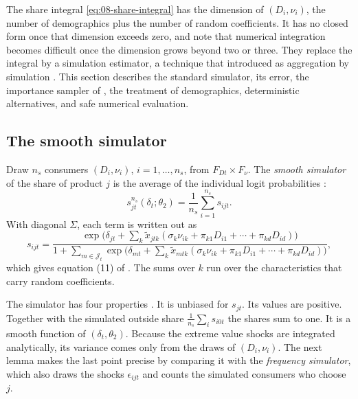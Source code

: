 The share integral \eqref{eq:08-share-integral} has the dimension of $(D_i, \nu_i)$, the number of demographics
plus the number of random coefficients. It has no closed form once that dimension exceeds zero, and
\citet[p.~866]{BerryLevinsohnPakes1995} note that numerical integration becomes difficult once the dimension grows
beyond two or three. They replace the integral by a simulation estimator, a technique that
\citet{Pakes1986} introduced as aggregation by simulation \citep[p.~848]{BerryLevinsohnPakes1995}. This section
describes the standard simulator, its error, the importance sampler of \citet{BerryLevinsohnPakes1995}, the
treatment of demographics, deterministic alternatives, and safe numerical evaluation.

\subsection{The smooth simulator}\label{sec:08-smooth-simulator}

Draw $n_s$ consumers $(D_i, \nu_i)$, $i = 1, \dots, n_s$, from $F_{Dt} \times F_\nu$. The \emph{smooth
simulator} of the share of product $j$ is the average of the individual logit probabilities
\citep[eq.~(6.10)]{BerryLevinsohnPakes1995}:
\begin{equation}\label{eq:08-smooth-simulator}
  s^{n_s}_{jt}(\delta_t; \theta_2) = \frac{1}{n_s}\sum_{i=1}^{n_s} s_{ijt}.
\end{equation}
With diagonal $\Sigma$, each term is written out as
\begin{equation*}
  s_{ijt} = \frac{\exp\bigl(\delta_{jt} + \sum_{k} \tilde x_{jtk}(\sigma_k\nu_{ik} + \pi_{k1}D_{i1} + \cdots
            + \pi_{kd}D_{id})\bigr)}
         {1 + \sum_{m \in \mathcal{J}_t}\exp\bigl(\delta_{mt} + \sum_{k} \tilde x_{mtk}(\sigma_k\nu_{ik}
          + \pi_{k1}D_{i1} + \cdots + \pi_{kd}D_{id})\bigr)},
\end{equation*}
which gives equation (11) of \citet{Nevo2000a}. The sums over $k$ run over the characteristics that carry random
coefficients.

The simulator has four properties \citep[p.~865]{BerryLevinsohnPakes1995}. It is unbiased for $s_{jt}$. Its
values are positive. Together with the simulated outside share $\frac{1}{n_s}\sum_i s_{i0t}$ the shares sum to
one. It is a smooth function of $(\delta_t, \theta_2)$. Because the extreme value shocks are integrated
analytically, its variance comes only from the draws of $(D_i, \nu_i)$. The next lemma makes the last point precise
by comparing it with the \emph{frequency simulator}, which also draws the shocks $\epsilon_{ijt}$ and counts the
simulated consumers who choose $j$.

